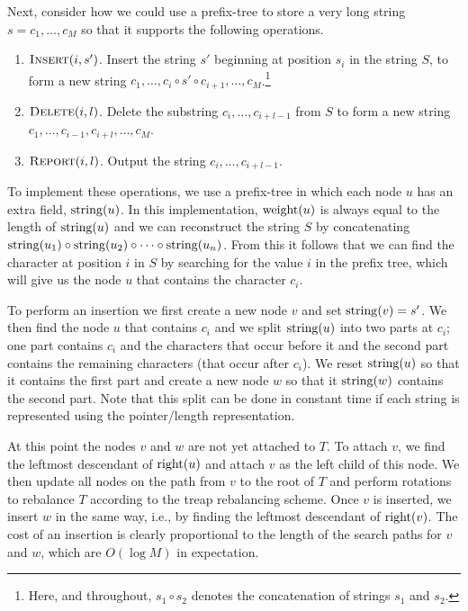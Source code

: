 Next, consider how we could use a prefix-tree to store a very long
string $s=c_1,\ldots, c_M$ so that it supports the following
operations.

\begin{enumerate}
\item $\textsc{Insert}(i, s')$. Insert the string $s'$ beginning at
position $s_i$ in the string $S$, to form a new string
$c_1,\ldots,c_i\circ s'\circ c_{i+1},\ldots,c_M$.\footnote{Here, and
throughout, $s_1\circ s_2$ denotes the concatenation of strings $s_1$
and $s_2$.}

\item $\textsc{Delete}(i, l)$.  Delete the substring
$c_i,\ldots,c_{i+l-1}$ from $S$ to form a new string
$c_1,\ldots,c_{i-1},c_{i+l},\ldots,c_M$.

\item $\textsc{Report}(i, l)$.  Output the string $c_i,\ldots,c_{i+l-1}$.
\end{enumerate}

To implement these operations, we use a prefix-tree in which each node
$u$ has an extra field, $\mathrm{string}(u)$.  In this implementation,
$\mathrm{weight}(u)$ is always equal to the length of $\mathrm{string}(u)$ and we can
reconstruct the string $S$ by concatenating $\mathrm{string}(u_1)\circ
\mathrm{string}(u_2)\circ\cdots\circ\mathrm{string}(u_n)$.  From this it follows that we
can find the character at position $i$ in $S$ by searching for the
value $i$ in the prefix tree, which will give us the node $u$ that
contains the character $c_i$.

To perform an insertion we first create a new node $v$ and set
$\mathrm{string}(v)=s'$.  We then find the node $u$ that contains $c_i$ and we
split $\mathrm{string}(u)$ into two parts at $c_i$; one part contains $c_i$ and
the characters that occur before it and the second part contains the
remaining characters (that occur after $c_i$).  We reset $\mathrm{string}(u)$
so that it contains the first part and create a new node $w$ so that
it $\mathrm{string}(w)$ contains the second part.  Note that this split can be
done in constant time if each string is represented using the pointer/length representation.

At this point the nodes $v$ and $w$ are not yet attached to $T$.  To
attach $v$, we find the leftmost descendant of $\mathrm{right}(u)$ and attach
$v$ as the left child of this node.  We then update all nodes on the
path from $v$ to the root of $T$ and perform rotations to rebalance
$T$ according to the treap rebalancing scheme.  Once $v$ is inserted,
we insert $w$ in the same way, i.e., by finding the leftmost
descendant of $\mathrm{right}(v)$.  The cost of an insertion is clearly
proportional to the length of the search paths for $v$ and $w$, which
are $O(\log M)$ in expectation.

